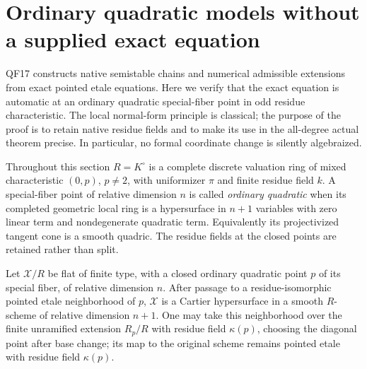 \section{Ordinary quadratic models without a supplied exact equation}
\label{r17on:section}

QF17 constructs native semistable chains and numerical
admissible extensions from exact pointed etale equations.
Here we verify that the exact equation is automatic at an
ordinary quadratic special-fiber point in odd residue
characteristic. The local normal-form principle is classical;
the purpose of the proof is to retain native residue fields
and to make its use in the all-degree actual theorem precise.
In particular, no formal coordinate change is silently
algebraized.

Throughout this section $R=K^\circ$ is a complete discrete
valuation ring of mixed characteristic $(0,p)$, $p\ne2$,
with uniformizer $\pi$ and finite residue field $k$.
A special-fiber point of relative dimension $n$ is called
\emph{ordinary quadratic} when its completed geometric local
ring is a hypersurface in $n+1$ variables with zero linear
term and nondegenerate quadratic term. Equivalently its
projectivized tangent cone is a smooth quadric. The residue
fields at the closed points are retained rather than split.

\begin{lemma}
\label{r17on:ambient}
Let $\mathcal X/R$ be flat of finite type, with a closed
ordinary quadratic point $p$ of its special fiber, of
relative dimension $n$. After passage to a
residue-isomorphic pointed etale neighborhood of $p$,
$\mathcal X$ is a Cartier hypersurface in a smooth
$R$-scheme of relative dimension $n+1$.
One may take this neighborhood over the finite unramified
extension $R_p/R$ with residue field $\kappa(p)$, choosing
the diagonal point after base change; its map to the
original scheme remains pointed etale with residue
field $\kappa(p)$.
\end{lemma}

